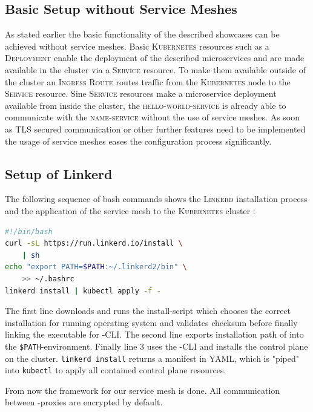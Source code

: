 \subsection{Basic Setup without Service Meshes}

As stated earlier the basic functionality of the described showcases can be achieved without service meshes. Basic \textsc{Kubernetes} resources such as a \textsc{Deployment} enable the deployment of the described microservices and are made available in the cluster via a \textsc{Service} resource. To make them available outside of the cluster an \textsc{Ingress Route} routes traffic from the \textsc{Kubernetes} node to the \textsc{Service} resource. Sine \textsc{Service} resources make a microservice deployment available from inside the cluster, the \textsc{hello-world-service} is already able to communicate with the \textsc{name-service} without the use of service meshes. As soon as TLS secured communication or other further features need to be implemented the usage of service meshes eases the configuration process significantly.

\subsection{Setup of Linkerd}

The following sequence of bash commands shows the \textsc{Linkerd} installation process and the application of the service mesh to the \textsc{Kubernetes} cluster \cite{linkerd-get-started}:
\begin{lstlisting}[language=bash,caption={Setup of \textsc{Linkerd}}, label={lst:linkerd-setup}]
#!/bin/bash
curl -sL https://run.linkerd.io/install \
	| sh
echo "export PATH=$PATH:~/.linkerd2/bin" \
	>> ~/.bashrc
linkerd install | kubectl apply -f -
\end{lstlisting}
The first line downloads and runs the install-script which chooses the correct installation for running operating system and validates checksum before finally linking the executable for \linkerd{}-CLI.
The second line exports installation path of \linkerd{} into the \lstinline|$PATH|-environment. 
Finally line 3 uses the \linkerd{}-CLI and installs the control plane on the cluster.
\lstinline|linkerd install| returns a \kubernetes{} manifest in YAML, which is "piped" into \lstinline|kubectl| to apply all contained control plane resources.

From now the framework for our service mesh is done.
All communication between \linkerd{}-proxies are encrypted by default.


